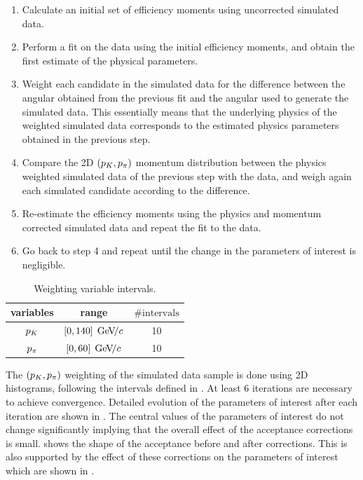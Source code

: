 \begin{enumerate}
\item Calculate an initial set of efficiency moments using uncorrected \BsJpsiKst simulated data.
\item Perform a fit on the \BsJpsiKst data using the initial efficiency moments, and obtain the first estimate of the physical parameters.
\item Weight each candidate in the simulated data for the difference between the angular \pdf obtained from the previous fit and the angular
      \pdf used to generate the simulated data. This essentially means that the underlying physics of the weighted simulated data corresponds
      to the estimated physics parameters obtained in the previous step.
\item Compare the 2D $(p_K,p_\pi)$ momentum distribution between the physics weighted simulated data of the previous step with the
      data, and weigh again each simulated candidate according to the difference.
\item Re-estimate the efficiency moments using the physics and momentum corrected \BsJpsiKst simulated data and repeat the fit to the \BsJpsiKst data.
\item Go back to step 4 and repeat until the change in the parameters of interest is negligible.
\end{enumerate}

\begin{table}[!h]
  \center
  \begin{tabular}{c c c}
    \hline
     variables & range & $\# \text{intervals}$ \\
    \hline
    $p_K$    &  $[0,140] \; {\mathrm{\,Ge\kern -0.1em V\!/}c}$  & 10      \\
    $p_\pi$    &  $[0,60]  \; {\mathrm{\,Ge\kern -0.1em V\!/}c}$  & 10      \\
    \hline
  \end{tabular}
  \caption{\small Weighting variable intervals.}
  \label{angAccBinning}
\end{table}

The $(p_K,p_\pi)$ weighting of the simulated data sample is done using 2D histograms, following the intervals defined in .
At least 6 iterations are necessary to achieve convergence. Detailed evolution of the parameters of interest after each iteration are shown in
. The central values of the parameters of interest do not change significantly implying that the overall effect of the
acceptance corrections is small.  shows the shape of the acceptance before and after corrections.
This is also supported by the effect of these corrections on the parameters of interest which are shown in .

